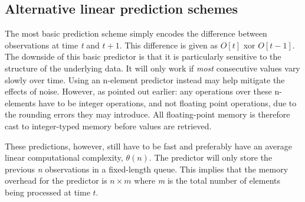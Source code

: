  \subsection{Alternative linear prediction schemes}
  The most basic prediction scheme simply encodes the difference between observations at time \textit{t} and $t+1$. This difference is given as $O[t]$ xor $O[t-1]$. The 
  downside of this basic predictor is that it is particularly sensitive to the structure of the underlying data. It will only work if \emph{most} consecutive values vary 
  slowly over time. Using an n-element predictor instead may help mitigate the effects of noise. However, as pointed out earlier: any operations over these n-elements 
  have to be integer operations, and not floating point operations, due to the rounding errors they may introduce. All floating-point memory is therefore 
  cast to integer-typed memory before values are retrieved.
  
  These predictions, however, still have to be fast and preferably have an average linear computational complexity, $\theta(n)$. The predictor will only 
  store the previous \textit{n} observations in a fixed-length queue. This implies that the memory overhead for the predictor is $n\times m$ where \textit{m} is 
  the total number of elements being processed at time $t$.
